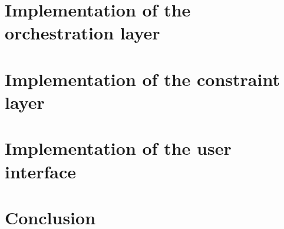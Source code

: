 \section{Implementation of the orchestration layer}
\doit

\section{Implementation of the constraint layer}
\doit

\section{Implementation of the user interface}
\doit

\section{Conclusion}
\doit
